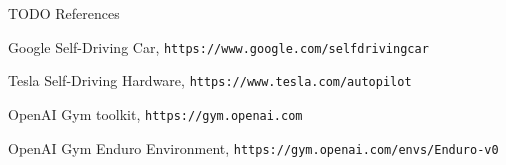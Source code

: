 \documentclass[a4paper]{article}
\begin{document}
TODO References\\


\begin{thebibliography}{9}
  Google Self-Driving Car, \texttt{https://www.google.com/selfdrivingcar}

  Tesla Self-Driving Hardware, \texttt{https://www.tesla.com/autopilot}

  OpenAI Gym toolkit, \texttt{https://gym.openai.com}

  OpenAI Gym Enduro Environment, \texttt{https://gym.openai.com/envs/Enduro-v0}

\end{thebibliography}
\end{document}
